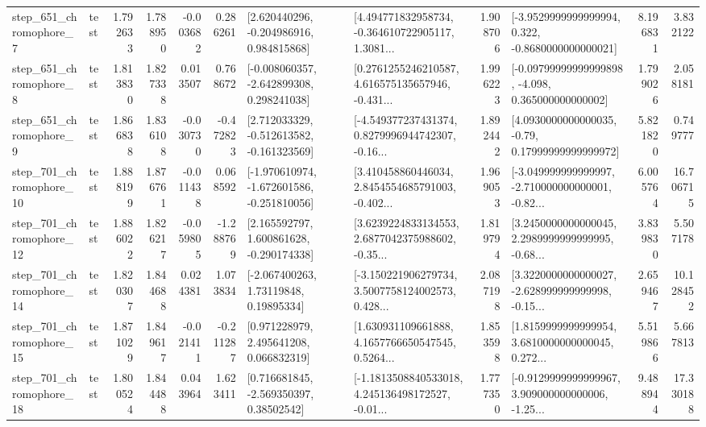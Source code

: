\begin{tabular}{llrrrrllrlrr}
   step\_651\_chromophore\_7 &      test &      1.792633 &    1.788950 &     -0.003682 &  0.286261 &    [2.620440296, -0.204986916, 0.984815868] &  [4.494771832958734, -0.364610722905117, 1.3081... &       1.908706 &  [-3.9529999999999994, 0.322, -0.8680000000000021] &            8.196831 &          3.832122 \\
   step\_651\_chromophore\_8 &      test &      1.813830 &    1.827338 &      0.013507 &  0.768672 &   [-0.008060357, -2.642899308, 0.298241038] &  [0.2761255246210587, 4.616575135657946, -0.431... &       1.996223 &  [-0.09799999999999898, -4.098, 0.365000000000002] &            1.799026 &          2.058181 \\
   step\_651\_chromophore\_9 &      test &      1.866838 &    1.836108 &     -0.030730 & -0.472823 &   [2.712033329, -0.512613582, -0.161323569] &  [-4.549377237431374, 0.8279996944742307, -0.16... &       1.892442 &   [4.0930000000000035, -0.79, 0.17999999999999972] &            5.821820 &          0.749777 \\
  step\_701\_chromophore\_10 &      test &      1.888199 &    1.876761 &     -0.011438 &  0.068592 &  [-1.970610974, -1.672601586, -0.251810056] &  [3.410458860446034, 2.8454554685791003, -0.402... &       1.969053 &  [-3.049999999999997, -2.710000000000001, -0.82... &            6.005764 &         16.706715 \\
  step\_701\_chromophore\_12 &      test &      1.886022 &    1.826217 &     -0.059805 & -1.288769 &    [2.165592797, 1.600861628, -0.290174338] &  [3.6239224833134553, 2.6877042375988602, -0.35... &       1.819794 &  [3.2450000000000045, 2.2989999999999995, -0.68... &            3.839830 &          5.507178 \\
  step\_701\_chromophore\_14 &      test &      1.820307 &    1.844688 &      0.024381 &  1.073834 &      [-2.067400263, 1.73119848, 0.19895334] &  [-3.150221906279734, 3.5007758124002573, 0.428... &       2.087198 &  [3.3220000000000027, -2.628999999999998, -0.15... &            2.659467 &         10.128452 \\
  step\_701\_chromophore\_15 &      test &      1.871029 &    1.849617 &     -0.021411 & -0.211287 &     [0.971228979, 2.495641208, 0.066832319] &  [1.630931109661888, 4.1657766650547545, 0.5264... &       1.853598 &  [1.8159999999999954, 3.6810000000000045, 0.272... &            5.519866 &          5.667813 \\
  step\_701\_chromophore\_18 &      test &      1.800524 &    1.844488 &      0.043964 &  1.623411 &     [0.716681845, -2.569350397, 0.38502542] &  [-1.1813508840533018, 4.245136498172527, -0.01... &       1.777350 &  [-0.9129999999999967, 3.909000000000006, -1.25... &            9.488944 &         17.330188 \\

\end{tabular}
